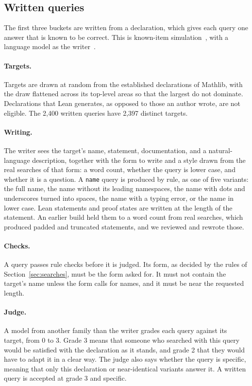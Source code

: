 \documentclass{article}
\newcommand{\code}[1]{\texttt{\small #1}}
\begin{document}
\subsection{Written queries}

The first three buckets are written from a declaration, which gives each
query one answer that is known to be correct. This is known-item
simulation~\cite{azzopardi2007simulated}, with a language model as the
writer~\cite{rahmani2024synthetic}.

\paragraph{Targets.} Targets are drawn at random from the established
declarations of Mathlib, with the draw flattened across its top-level areas so
that the largest do not dominate. Declarations that Lean generates, as opposed
to those an author wrote, are not eligible. The 2,400 written queries have 2,397
distinct targets.

\paragraph{Writing.} The writer sees the target's name, statement,
documentation, and a natural-language description, together with the form to
write and a style drawn from the real searches of that form: a word count,
whether the query is lower case, and whether it is a question. A
\code{name} query is produced by rule, as one of five variants: the full
name, the name without its leading namespaces, the name with dots and
underscores turned into spaces, the name with a typing error, or the name in
lower case. Lean statements and proof states
are written at the length of the statement. An earlier build held them to a
word count from real searches, which produced padded and truncated statements,
and we reviewed and rewrote those.

\paragraph{Checks.} A query passes rule checks before it is judged. Its form,
as decided by the rules of Section~\ref{sec:searches}, must be the form asked
for. It must not contain the target's name unless the form calls for names,
and it must be near the requested length.

\paragraph{Judge.} A model from another family than the writer grades each
query against its target, from 0 to 3. Grade 3 means that someone who searched
with this query would be satisfied with the declaration as it stands, and
grade 2 that they would have to adapt it in a clear way. The judge also says
whether the query is specific, meaning that only this declaration or
near-identical variants answer it. A written query is accepted at grade 3 and
specific.
\end{document}
